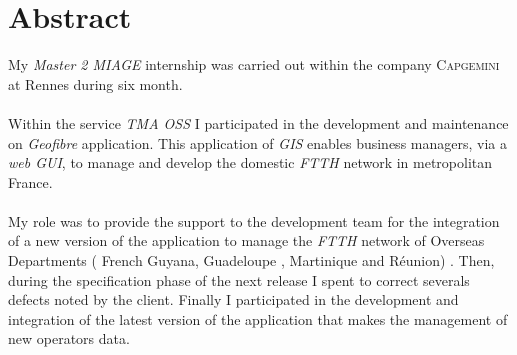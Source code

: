 \chapter*{Abstract}

My \textit{Master 2 MIAGE} internship was carried out within the company \textsc{Capgemini} at Rennes during six month.
\\\\
Within the service \textit{TMA OSS} I participated in the development and maintenance on \textit{Geofibre} application.
This application of \textit{GIS} enables business managers, via a \textit{web GUI}, to manage and develop the domestic \textit{FTTH} network in metropolitan France.
\\\\
My role was to provide the support to the development team for the integration of a new version of the application
to manage the \textit{FTTH} network of Overseas Departments ( French Guyana, Guadeloupe , Martinique and Réunion) .
Then, during the specification phase of the next release I spent to correct severals defects noted by the client.
Finally I participated in the development and integration of the latest version of the application that makes the management of new operators data.
